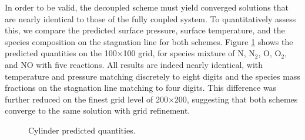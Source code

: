 In order to be valid, the decoupled scheme must yield converged solutions that
are nearly identical to those of the fully coupled system. To quantitatively
assess this, we compare the predicted surface pressure, surface temperature, and
the species composition on the stagnation line for both schemes.  Figure
\ref{pq} shows the predicted quantities on the 100$\times$100 grid, for species
mixture of N, $\text{N}_2$, O, $\text{O}_2$, and NO with five reactions. All
results are indeed nearly identical, with temperature and pressure matching
discretely to eight digits and the species mass fractions on the stagnation line
matching to four digits.  This difference was further reduced on the finest grid
level of 200$\times$200, suggesting that both schemes converge to the same
solution with grid refinement.
\begin{figure}[h!]
  \captionsetup[subfigure]{position=b}
  \centering
	\caption{Cylinder predicted quantities.}
	\label{pq}
\end{figure}

